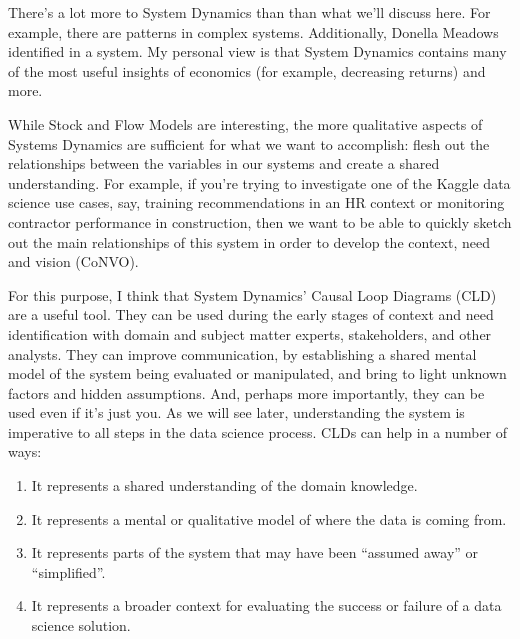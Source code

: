 \documentclass[letterpaper,10pt,english]{sphinxmanual}
\begin{document}
There’s a lot more to System Dynamics than than what we’ll discuss here. For example, there are  patterns in complex systems. Additionally, Donella Meadows identified  in a system. My personal view is that System Dynamics contains many of the most useful insights of economics (for example, decreasing returns) and more.

While Stock and Flow Models are interesting, the more qualitative aspects of Systems Dynamics are sufficient for what we want to accomplish: flesh out the relationships between the variables in our systems and create a shared understanding. For example, if you’re trying to investigate one of the Kaggle data science use cases, say, training recommendations in an HR context or monitoring contractor performance in construction, then we want to be able to quickly sketch out the main relationships of
this system in order to develop the context, need and vision (CoNVO).

For this purpose, I think that System Dynamics’ Causal Loop Diagrams (CLD) are a useful tool. They can be used during the early stages of context and need identification with domain and subject matter experts, stakeholders, and other analysts. They can improve communication, by establishing a shared mental model of the system being evaluated or manipulated, and bring to light unknown factors and hidden assumptions. And, perhaps more importantly, they can be used even if it’s just you. As we will
see later, understanding the system is imperative to all steps in the data science process. CLDs can help in a number of ways:
\begin{enumerate}
\def\theenumi{\arabic{enumi}}
\def\labelenumi{\theenumi .}
\makeatletter\def\p@enumii{\p@enumi \theenumi .}\makeatother
\item {} 
It represents a shared understanding of the domain knowledge.

\item {} 
It represents a mental or qualitative model of where the data is coming from.

\item {} 
It represents parts of the system that may have been “assumed away” or “simplified”.

\item {} 
It represents a broader context for evaluating the success or failure of a data science solution.

\end{enumerate}
\end{document}
